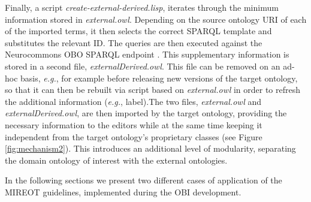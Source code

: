 \documentclass{ao2e}%
\begin{document}
Finally, a script \emph{create-external-derived.lisp}, iterates through the minimum information stored in \emph{external.owl}.
Depending on the source ontology URI of each of the imported terms, it then selects the correct SPARQL template and substitutes the relevant ID.
The queries are then executed against the Neurocommons OBO SPARQL endpoint \cite{NeurocommonsSparql,Neurocommons}. This supplementary information is stored in a second file, \emph{externalDerived.owl}.
This file can be removed on an ad-hoc basis, \emph{e.g.}, for example before releasing new versions of the target ontology, so that it can then be rebuilt via script based on \emph{external.owl} in order to refresh the additional information (\emph{e.g.}, label).The two files, \emph{external.owl} and \emph{externalDerived.owl}, are then imported by the target ontology, providing the necessary information to the editors while at the same time keeping it independent from the target ontology's proprietary classes (see Figure \ref{fig:mechanism2}). This introduces an additional level of modularity, separating the domain ontology of interest with the external ontologies.%

In the following sections we present two different cases of application of the \ac{MIREOT} guidelines, implemented during the \ac{OBI} development.
\end{document}
